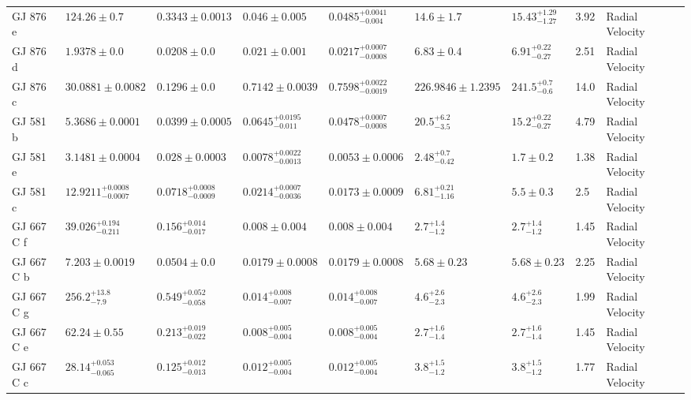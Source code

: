 \begin{tabular}{llllllllll}
GJ 876 e & $124.26 \pm 0.7$ & $0.3343 \pm 0.0013$ & $0.046 \pm 0.005$ & $0.0485^{+0.0041}_{-0.004}$ & $14.6 \pm 1.7$ & $15.43^{+1.29}_{-1.27}$ & 3.92 & Radial Velocity & \cite{RIVERA_ET_AL__2010} \\
GJ 876 d & $1.9378 \pm 0.0$ & $0.0208 \pm 0.0$ & $0.021 \pm 0.001$ & $0.0217^{+0.0007}_{-0.0008}$ & $6.83 \pm 0.4$ & $6.91^{+0.22}_{-0.27}$ & 2.51 & Radial Velocity & \cite{RIVERA_ET_AL__2010} \\
GJ 876 c & $30.0881 \pm 0.0082$ & $0.1296 \pm 0.0$ & $0.7142 \pm 0.0039$ & $0.7598^{+0.0022}_{-0.0019}$ & $226.9846 \pm 1.2395$ & $241.5^{+0.7}_{-0.6}$ & 14.0 & Radial Velocity & \cite{RIVERA_ET_AL__2010} \\
GJ 581 b & $5.3686 \pm 0.0001$ & $0.0399 \pm 0.0005$ & $0.0645^{+0.0195}_{-0.011}$ & $0.0478^{+0.0007}_{-0.0008}$ & $20.5^{+6.2}_{-3.5}$ & $15.2^{+0.22}_{-0.27}$ & 4.79 & Radial Velocity & \cite{VON_STAUFFENBERG_ET_AL__2024} \\
GJ 581 e & $3.1481 \pm 0.0004$ & $0.028 \pm 0.0003$ & $0.0078^{+0.0022}_{-0.0013}$ & $0.0053 \pm 0.0006$ & $2.48^{+0.7}_{-0.42}$ & $1.7 \pm 0.2$ & 1.38 & Radial Velocity & \cite{VON_STAUFFENBERG_ET_AL__2024} \\
GJ 581 c & $12.9211^{+0.0008}_{-0.0007}$ & $0.0718^{+0.0008}_{-0.0009}$ & $0.0214^{+0.0007}_{-0.0036}$ & $0.0173 \pm 0.0009$ & $6.81^{+0.21}_{-1.16}$ & $5.5 \pm 0.3$ & 2.5 & Radial Velocity & \cite{VON_STAUFFENBERG_ET_AL__2024} \\
GJ 667 C f & $39.026^{+0.194}_{-0.211}$ & $0.156^{+0.014}_{-0.017}$ & $0.008 \pm 0.004$ & $0.008 \pm 0.004$ & $2.7^{+1.4}_{-1.2}$ & $2.7^{+1.4}_{-1.2}$ & 1.45 & Radial Velocity & \cite{ANGLADA_ESCUDE_ET_AL__2013} \\
GJ 667 C b & $7.203 \pm 0.0019$ & $0.0504 \pm 0.0$ & $0.0179 \pm 0.0008$ & $0.0179 \pm 0.0008$ & $5.68 \pm 0.23$ & $5.68 \pm 0.23$ & 2.25 & Radial Velocity & \cite{BONFILS_ET_AL__2013} \\
GJ 667 C g & $256.2^{+13.8}_{-7.9}$ & $0.549^{+0.052}_{-0.058}$ & $0.014^{+0.008}_{-0.007}$ & $0.014^{+0.008}_{-0.007}$ & $4.6^{+2.6}_{-2.3}$ & $4.6^{+2.6}_{-2.3}$ & 1.99 & Radial Velocity & \cite{ANGLADA_ESCUDE_ET_AL__2013} \\
GJ 667 C e & $62.24 \pm 0.55$ & $0.213^{+0.019}_{-0.022}$ & $0.008^{+0.005}_{-0.004}$ & $0.008^{+0.005}_{-0.004}$ & $2.7^{+1.6}_{-1.4}$ & $2.7^{+1.6}_{-1.4}$ & 1.45 & Radial Velocity & \cite{ANGLADA_ESCUDE_ET_AL__2013} \\
GJ 667 C c & $28.14^{+0.053}_{-0.065}$ & $0.125^{+0.012}_{-0.013}$ & $0.012^{+0.005}_{-0.004}$ & $0.012^{+0.005}_{-0.004}$ & $3.8^{+1.5}_{-1.2}$ & $3.8^{+1.5}_{-1.2}$ & 1.77 & Radial Velocity & \cite{ANGLADA_ESCUDE_ET_AL__2013} \\

\end{tabular}

